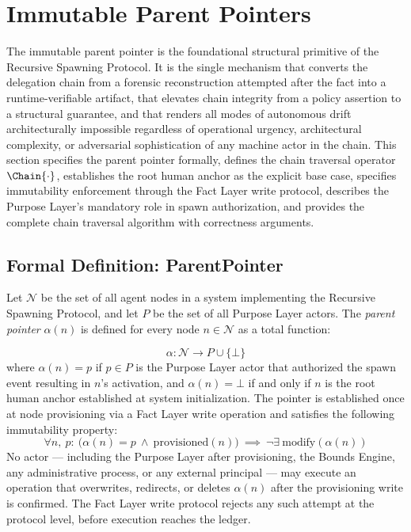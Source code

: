 \section{Immutable Parent Pointers}
\label{sec:immutable-parent-pointers}

The immutable parent pointer is the foundational structural primitive of the Recursive Spawning Protocol. It is the single mechanism that converts the delegation chain from a forensic reconstruction attempted after the fact into a runtime-verifiable artifact, that elevates chain integrity from a policy assertion to a structural guarantee, and that renders all modes of autonomous drift architecturally impossible regardless of operational urgency, architectural complexity, or adversarial sophistication of any machine actor in the chain. This section specifies the parent pointer formally, defines the chain traversal operator $\Chain{\cdot}$, establishes the root human anchor as the explicit base case, specifies immutability enforcement through the Fact Layer write protocol, describes the Purpose Layer's mandatory role in spawn authorization, and provides the complete chain traversal algorithm with correctness arguments.

\subsection{Formal Definition: ParentPointer}
\label{sec:parent-pointer-definition}

Let $\mathcal{N}$ be the set of all agent nodes in a \bxthree{} system implementing the Recursive Spawning Protocol, and let $P$ be the set of all Purpose Layer actors. The \emph{parent pointer} $\alpha(n)$ is defined for every node $n \in \mathcal{N}$ as a total function:

\begin{dfn}
\label{dfn:parent-pointer}
\begin{equation}
\alpha : \mathcal{N} \longrightarrow P \cup \{\bot\}
\end{equation}
where $\alpha(n) = p$ if $p \in P$ is the Purpose Layer actor that authorized the spawn event resulting in $n$'s activation, and $\alpha(n) = \bot$ if and only if $n$ is the root human anchor established at system initialization. The pointer is established once at node provisioning via a Fact Layer write operation and satisfies the following immutability property:
\begin{equation}
\forall n,\ p:\ \bigl(\alpha(n) = p \ \land \ \text{provisioned}(n)\bigr) \ \implies \ \neg\exists\ \text{modify}(\alpha(n))
\label{eq:parent-pointer-immutability}
\end{equation}
No actor --- including the Purpose Layer after provisioning, the Bounds Engine, any administrative process, or any external principal --- may execute an operation that overwrites, redirects, or deletes $\alpha(n)$ after the provisioning write is confirmed. The Fact Layer write protocol rejects any such attempt at the protocol level, before execution reaches the ledger.
\end{dfn}

